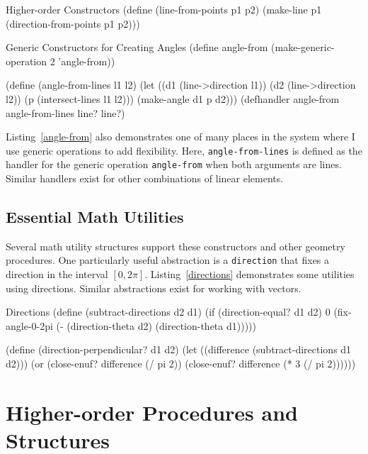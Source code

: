 \begin{code-listing}
[label=line-from-points]
{Higher-order Constructors}
(define (line-from-points p1 p2)
  (make-line p1 (direction-from-points p1 p2)))

\end{code-listing}

\begin{code-listing}
[label=angle-from]
{Generic Constructors for Creating Angles}
(define angle-from (make-generic-operation 2 'angle-from))

(define (angle-from-lines l1 l2)
  (let ((d1 (line->direction l1))
        (d2 (line->direction l2))
        (p (intersect-lines l1 l2)))
    (make-angle d1 p d2)))
(defhandler angle-from angle-from-lines line? line?)
\end{code-listing}

Listing~\ref{angle-from} also demonstrates one of many places in the
system where I use generic operations to add flexibility. Here,
\texttt{angle-from-lines} is defined as the handler for the generic
operation \texttt{angle-from} when both arguments are lines. Similar
handlers exist for other combinations of linear elements.

\subsection{Essential Math Utilities}

Several math utility structures support these constructors and other
geometry procedures. One particularly useful abstraction is a
\texttt{direction} that fixes a direction in the interval $[0, 2
  \pi]$. Listing~\ref{directions} demonstrates some utilities using
directions. Similar abstractions exist for working with vectors.

\begin{code-listing}
[label=directions]
{Directions}
(define (subtract-directions d2 d1)
  (if (direction-equal? d1 d2)
      0
      (fix-angle-0-2pi (- (direction-theta d2)
                          (direction-theta d1)))))

(define (direction-perpendicular? d1 d2)
  (let ((difference (subtract-directions d1 d2)))
    (or (close-enuf? difference (/ pi 2))
        (close-enuf? difference (* 3 (/ pi 2))))))
\end{code-listing}

\section{Higher-order Procedures and Structures}

